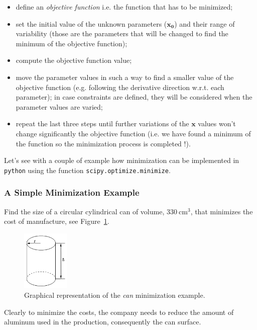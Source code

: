 \begin{itemize}
\tightlist
\item
  define an \emph{objective function} i.e. the function that has to be minimized;
\item
  set the initial value of the unknown parameters (\(\mathbf{x_0}\)) and their range of variability (those are the parameters that will be changed to find the minimum of the objective function);
\item
  compute the objective function value;
\item
  move the parameter values in such a way to find a smaller value of the objective function (e.g. following the derivative direction w.r.t. each parameter); in case constraints are defined, they will be considered when the parameter values are varied;
\item
  repeat the last three steps until further variations of the \(\mathbf{x}\) values won't change significantly the objective
  function (i.e. we have found a minimum of the function so the minimization process is completed !).
\end{itemize}

Let's see with a couple of example how minimization can be implemented in \texttt{python} using the function \texttt{scipy.optimize.minimize}.

\subsubsection{A Simple Minimization Example}
\label{example}

Find the size of a circular cylindrical can of volume, \(330~\mathrm{cm}^3\), that minimizes the cost of manufacture, see Figure~\ref{fig:cylinder}.

\begin{figure}[h]
\centering
\includegraphics[width=0.2\textwidth]{figures/cylinder.png}
\caption{Graphical representation of the \emph{can} minimization example.}
\label{fig:cylinder}
\end{figure}

Clearly to minimize the costs, the company needs to reduce the amount of aluminum used in the production, consequently the can surface. 


